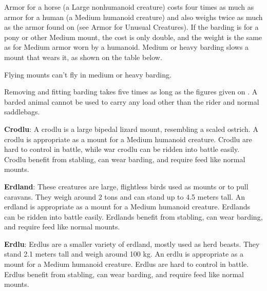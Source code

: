 Armor for a horse (a Large nonhumanoid creature) costs four times as much as armor for a human (a Medium humanoid creature) and also weighs twice as much as the armor found on  (see Armor for Unusual Creatures). If the barding is for a pony or other Medium mount, the cost is only double, and the weight is the same as for Medium armor worn by a humanoid. Medium or heavy barding slows a mount that wears it, as shown on the table below.

Flying mounts can't fly in medium or heavy barding.

Removing and fitting barding takes five times as long as the figures given on . A barded animal cannot be used to carry any load other than the rider and normal saddlebags.


\textbf{Crodlu}: A crodlu is a large bipedal lizard mount, resembling a scaled ostrich. A crodlu is appropriate as a mount for a Medium humanoid creature. Crodlu are hard to control in battle, while war crodlu can be ridden into battle easily. Crodlu benefit from stabling, can wear barding, and require feed like normal mounts.

\textbf{Erdland}: These creatures are large, flightless birds used as mounts or to pull caravans. They weigh around 2 tons and can stand up to 4.5 meters tall. An erdland is appropriate as a mount for a Medium humanoid creature. Erdlands can be ridden into battle easily. Erdlands benefit from stabling, can wear barding, and require feed like normal mounts.

\textbf{Erdlu}: Erdlus are a smaller variety of erdland, mostly used as herd beasts. They stand 2.1 meters tall and weigh around 100 kg. An erdlu is appropriate as a mount for a Medium humanoid creature. Erdlus are hard to control in battle. Erdlus benefit from stabling, can wear barding, and require feed like normal mounts.

